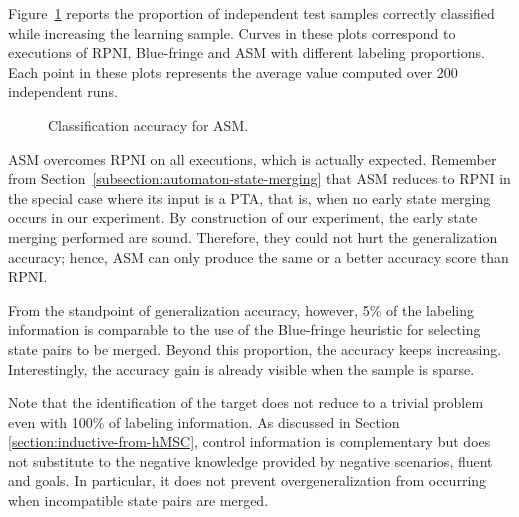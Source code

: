 Figure~\ref{image:evaluation-asm-accuracy} reports the proportion of independent test samples correctly classified while increasing the learning sample. Curves in these plots correspond to executions of RPNI, Blue-fringe and ASM with different labeling proportions. Each point in these plots represents the average value computed over 200 independent runs. 

\begin{figure}
\begin{center}
\caption{Classification accuracy for ASM\label{image:evaluation-asm-accuracy}.}
\end{center}
\end{figure}

ASM overcomes RPNI on all executions, which is actually expected. Remember from Section~\ref{subsection:automaton-state-merging} that ASM reduces to RPNI in the special case where its input is a PTA, that is, when no early state merging occurs in our experiment. By construction of our experiment, the early state merging performed are sound. Therefore, they could not hurt the generalization accuracy; hence, ASM can only produce the same or a better accuracy score than RPNI.

From the standpoint of generalization accuracy, however, 5\% of the labeling information is comparable to the use of the Blue-fringe heuristic for selecting state pairs to be merged. Beyond this proportion, the accuracy keeps increasing. Interestingly, the accuracy gain is already visible when the sample is sparse.

Note that the identification of the target does not reduce to a trivial problem even with 100\% of labeling information. As discussed in Section \ref{section:inductive-from-hMSC}, control information is complementary but does not substitute to the negative knowledge provided by negative scenarios, fluent and goals. In particular, it does not prevent overgeneralization from occurring when incompatible state pairs are merged. 
